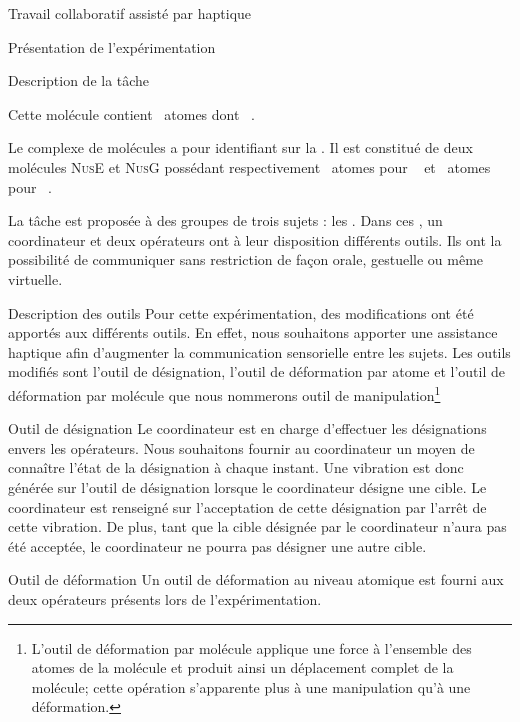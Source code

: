 \documentclass[myfrancais]{mythesis}
\begin{document}
\begin{mychapter}{Travail collaboratif assisté par haptique}
\begin{mysection}{Présentation de l'expérimentation}
\begin{mysubsection}{Description de la tâche}
\begin{description}
						Cette molécule contient ~atomes dont ~.
					\item[\myNusENusG]
						Le complexe de molécules \myNusENusG {} a pour identifiant \myPDB {} sur la \myPDBbase\footnotemark[\value{footnote}].
						Il est constitué de deux molécules \textsc{NusE} et \textsc{NusG} possédant respectivement ~atomes pour ~ et ~atomes pour ~.
				\end{description}

				La tâche est proposée à des groupes de trois sujets : les .
				Dans ces , un \og coordinateur \fg et deux \og opérateurs \fg ont à leur disposition différents outils.
				Ils ont la possibilité de communiquer sans restriction de façon orale, gestuelle ou même virtuelle.
				\begin{mysubsubsection}{Description des outils}
					Pour cette expérimentation, des modifications ont été apportés aux différents outils.
					En effet, nous souhaitons apporter une assistance haptique afin d'augmenter la communication sensorielle entre les sujets.
					Les outils modifiés sont l'outil de désignation, l'outil de déformation par atome et l'outil de déformation par molécule que nous nommerons outil de manipulation\footnote{L'outil de déformation par molécule applique une force à l'ensemble des atomes de la molécule et produit ainsi un déplacement complet de la molécule; cette opération s'apparente plus à une manipulation qu'à une déformation.}
					\begin{myparagraph}{Outil de désignation}
						Le coordinateur est en charge d'effectuer les désignations envers les opérateurs.
						Nous souhaitons fournir au coordinateur un moyen de connaître l'état de la désignation à chaque instant.
						Une vibration est donc générée sur l'outil de désignation lorsque le coordinateur désigne une cible.
						Le coordinateur est renseigné sur l'acceptation de cette désignation par l'arrêt de cette vibration.
						De plus, tant que la cible désignée par le coordinateur n'aura pas été acceptée, le coordinateur ne pourra pas désigner une autre cible.
					\end{myparagraph}
					\begin{myparagraph}{Outil de déformation}
						Un outil de déformation au niveau atomique est fourni aux deux opérateurs présents lors de l'expérimentation.

\end{myparagraph}
\end{mysubsubsection}
\end{mysubsection}
\end{mysection}
\end{mychapter}
\end{document}
